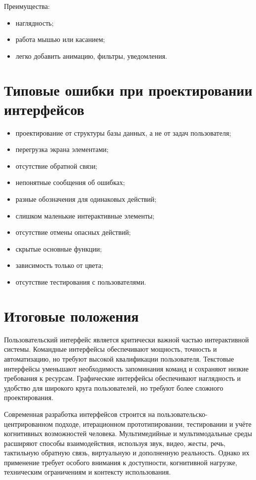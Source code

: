\documentclass[12pt,a4paper]{article}
\begin{document}
Преимущества:
\begin{itemize}
    \item наглядность;
    \item работа мышью или касанием;
    \item легко добавить анимацию, фильтры, уведомления.
\end{itemize}

\section{Типовые ошибки при проектировании интерфейсов}

\begin{itemize}
    \item проектирование от структуры базы данных, а не от задач пользователя;
    \item перегрузка экрана элементами;
    \item отсутствие обратной связи;
    \item непонятные сообщения об ошибках;
    \item разные обозначения для одинаковых действий;
    \item слишком маленькие интерактивные элементы;
    \item отсутствие отмены опасных действий;
    \item скрытые основные функции;
    \item зависимость только от цвета;
    \item отсутствие тестирования с пользователями.
\end{itemize}

\section{Итоговые положения}

Пользовательский интерфейс является критически важной частью интерактивной системы. Командные интерфейсы обеспечивают мощность, точность и автоматизацию, но требуют высокой квалификации пользователя. Текстовые интерфейсы уменьшают необходимость запоминания команд и сохраняют низкие требования к ресурсам. Графические интерфейсы обеспечивают наглядность и удобство для широкого круга пользователей, но требуют более сложного проектирования.

Современная разработка интерфейсов строится на пользовательско-центрированном подходе, итерационном прототипировании, тестировании и учёте когнитивных возможностей человека. Мультимедийные и мультимодальные среды расширяют способы взаимодействия, используя звук, видео, жесты, речь, тактильную обратную связь, виртуальную и дополненную реальность. Однако их применение требует особого внимания к доступности, когнитивной нагрузке, техническим ограничениям и контексту использования.
\end{document}
